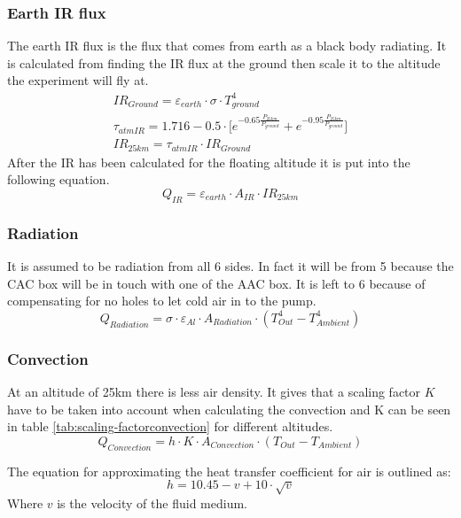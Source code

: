 \subsubsection{Earth IR flux}
The earth IR flux is the flux that comes from earth as a black body radiating. It is calculated from finding the IR flux at the ground then scale it to the altitude the experiment will fly at.
\begin{gather*}
    IR_{Ground} = \varepsilon_{earth} \cdot \sigma \cdot T_{ground}^4 \\
    \tau_{atmIR} = 1.716 - 0.5\cdot \Bigg[e^{-0.65\frac{P_{25km}}{P_{ground}}} + e^{-0.95\frac{P_{25km}}{P_{ground}}}\Bigg] \\
    IR_{25km} = \tau_{atmIR} \cdot IR_{Ground}
\end{gather*}
After the IR has been calculated for the floating altitude it is put into the following equation. 
\begin{equation*}
    Q_{IR} = \varepsilon_{earth} \cdot A_{IR} \cdot IR_{25km}
\end{equation*}

\subsubsection{Radiation}
It is assumed to be radiation from all 6 sides. In fact it will be from 5 because the CAC box will be in touch with one of the AAC box. It is left to 6 because of compensating for no holes to let cold air in to the pump.
\begin{equation*}
    Q_{Radiation} = \sigma \cdot \varepsilon_{Al} \cdot A_{Radiation} \cdot (T_{Out}^4 - T_{Ambient}^4 )
\end{equation*}

\subsubsection{Convection}
At an altitude of 25km there is less air density. It gives that a scaling factor $K$ have to be taken into account when calculating the convection and K can be seen in table \ref{tab:scaling-factorconvection} for different altitudes.
\begin{equation*}
    Q_{Convection} = h \cdot K \cdot A_{Convection} \cdot (T_{Out} - T_{Ambient})
\end{equation*}

The equation for approximating the heat transfer coefficient for air is outlined as:
\begin{equation*}
h = 10.45 - v + 10\cdot\sqrt{v}
\end{equation*}
Where $v$ is the velocity of the fluid medium.

